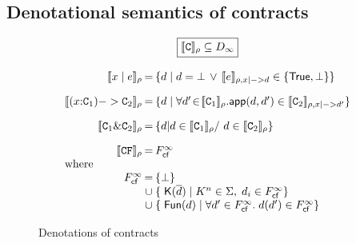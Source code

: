 


\subsection{Denotational semantics of contracts} \label{s:den-sem-contracts}

\begin{figure}
$$
\setlength{\arraycolsep}{1pt}
\begin{array}{rcl}
\multicolumn{3}{c}{
\ruleform{\dbrace{\Ct}_{\rho} \subseteq D_{\infty}} }
\\ \\
\dbrace{x \mid e}_\rho
  & =  & \{ d \mid \unroll{d} = \bot \, \lor \, \unroll{\dbrace{e}_{\rho,x|->d}} 
                \in \{ \ret{\injKZ{True} , \bot} \} \} 
\\[1em]
\dbrace{(x{:}\Ct_1) -> \Ct_2}_{\rho}
 & = & \{ d \mid
           \forall d' \!\in\! \dbrace{\Ct_1}_\rho.
           \dapp(d,d') \in \dbrace{\Ct_2}_{\rho,x|->d'}
           \}
\\[1em]
\dbrace{\Ct_1 \& \Ct_2}_\rho
 & = & \{ d | d \in \dbrace{\Ct_1}_\rho /\ d \in \dbrace{\Ct_2}_\rho \}
\\[1em]
\dbrace{\CF}_\rho & = &  \Fcf^{\infty}  \\
\multicolumn{3}{l}{\text{where}} \\
   F_{\lcfZ}^{\infty} & = & \{ \bot \} \\
                   & \cup & \{\;\injK{K}{\ol{d}} \mid K^n \in \Sigma,\; d_i \in F_{\lcfZ}^{\infty} \} \\
                   & \cup & \{\;\injFun{d} \mid \forall d' \in F_{\lcfZ}^{\infty}.\; d(d') \in F_{\lcfZ}^{\infty} \}
\end{array}
$$
\caption{Denotations of contracts} \label{f:den-sem-contracts}
\end{figure}

